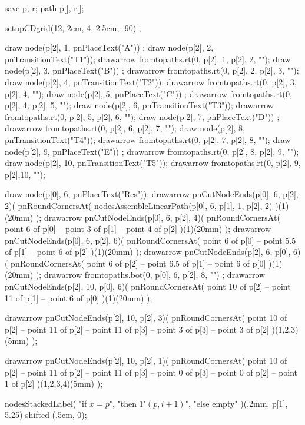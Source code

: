 
\usemodule[commDiag]

\startMPpage
save p, r; path p[], r[];

setupCDgrid(12, 2cm, 4, 2.5cm, -90) ;

draw node(p[2],  1, pnPlaceText("A")) ;
draw node(p[2],  2, pnTransitionText("T1"));
drawarrow fromtopaths.rt(0, p[2], 1, p[2], 2, "");
draw node(p[2],  3, pnPlaceText("B")) ;
drawarrow fromtopaths.rt(0, p[2], 2, p[2], 3, "");
draw node(p[2],  4, pnTransitionText("T2"));
drawarrow fromtopaths.rt(0, p[2], 3, p[2], 4, "");
draw node(p[2],  5, pnPlaceText("C")) ;
drawarrow fromtopaths.rt(0, p[2], 4, p[2], 5, "");
draw node(p[2],  6, pnTransitionText("T3"));
drawarrow fromtopaths.rt(0, p[2], 5, p[2], 6, "");
draw node(p[2],  7, pnPlaceText("D")) ;
drawarrow fromtopaths.rt(0, p[2], 6, p[2], 7, "");
draw node(p[2],  8, pnTransitionText("T4"));
drawarrow fromtopaths.rt(0, p[2], 7, p[2], 8, "");
draw node(p[2],  9, pnPlaceText("E")) ;
drawarrow fromtopaths.rt(0, p[2], 8, p[2], 9, "");
draw node(p[2], 10, pnTransitionText("T5"));
drawarrow fromtopaths.rt(0, p[2], 9, p[2],10, "");

draw node(p[0], 6, pnPlaceText("Res"));
drawarrow pnCutNodeEnds(p[0], 6, p[2], 2)(
  pnRoundCornersAt(
    nodesAssembleLinearPath(p[0], 6, p[1], 1, p[2], 2)
  )(1)(20mm)
);
drawarrow pnCutNodeEnds(p[0], 6, p[2], 4)(
  pnRoundCornersAt(
    point 6 of p[0] -- point 3 of p[1] -- point 4 of p[2]
  )(1)(20mm)
);
drawarrow pnCutNodeEnds(p[0], 6, p[2], 6)(
  pnRoundCornersAt(
    point 6 of p[0] -- point 5.5 of p[1] -- point 6 of p[2]
  )(1)(20mm)
);
drawarrow pnCutNodeEnds(p[2], 6, p[0], 6)(
  pnRoundCornersAt(
    point 6 of p[2] -- point 6.5 of p[1] -- point 6 of p[0]
  )(1)(20mm)
);
drawarrow fromtopaths.bot(0, p[0], 6, p[2], 8, "") ;
drawarrow pnCutNodeEnds(p[2], 10, p[0], 6)(
  pnRoundCornersAt(
    point 10 of p[2] -- point 11 of p[1] -- point 6 of p[0]
  )(1)(20mm)
);

drawarrow pnCutNodeEnds(p[2], 10, p[2], 3)(
  pnRoundCornersAt(
    point 10 of p[2] -- point 11 of p[2] -- point 11 of p[3]
    -- point 3 of p[3] -- point 3 of p[2]
  )(1,2,3)(5mm)
);

drawarrow pnCutNodeEnds(p[2], 10, p[2], 1)(
  pnRoundCornersAt(
    point 10 of p[2] -- point 11 of p[2] -- point 11 of p[3]
    -- point 0 of p[3] -- point 0 of p[2] -- point 1 of p[2]
  )(1,2,3,4)(5mm)
);

nodesStackedLabel(
  "if $x=p$", "then $1'(p,i+1)$", "else empty"
)(.2mm, p[1], 5.25) shifted (.5cm, 0);

\stopMPpage